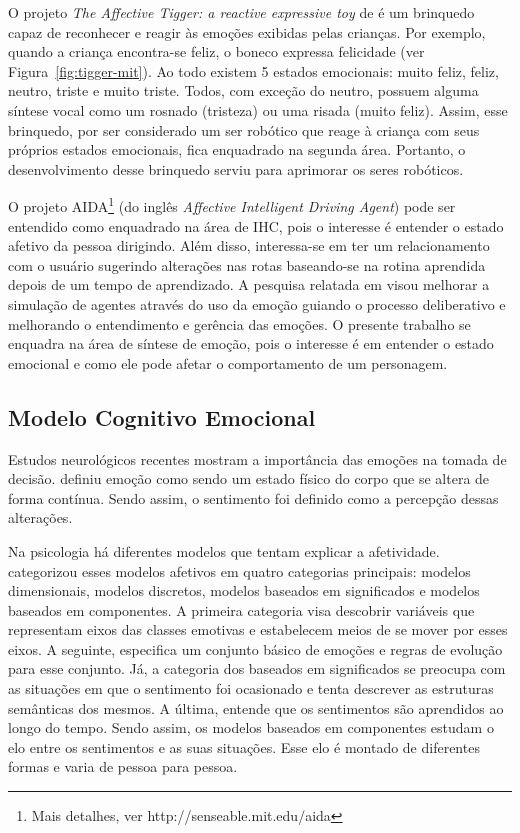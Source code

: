 O projeto \emph{The Affective Tigger: a reactive expressive toy} de
\citet{kirsch1999affective} é um brinquedo capaz de reconhecer e reagir às
emoções exibidas pelas crianças. Por exemplo, quando a criança encontra-se
feliz, o boneco expressa felicidade (ver Figura~\ref{fig:tigger-mit}). Ao todo
existem 5 estados emocionais: muito feliz, feliz, neutro, triste e muito
triste. Todos, com exceção do neutro, possuem alguma síntese vocal como um
rosnado (tristeza) ou uma risada (muito feliz). Assim, esse brinquedo, por ser
considerado um ser robótico que reage à criança com seus próprios estados
emocionais, fica enquadrado na segunda área.  Portanto, o desenvolvimento
desse brinquedo serviu para aprimorar os seres robóticos.

O projeto AIDA\footnote{Mais detalhes, ver http://senseable.mit.edu/aida} (do
inglês \emph{Affective Intelligent Driving Agent}) pode ser entendido como
enquadrado na área de IHC, pois o interesse é entender o estado afetivo da
pessoa dirigindo. Além disso, interessa-se em ter um relacionamento com o
usuário sugerindo alterações nas rotas baseando-se na rotina aprendida depois de
um tempo de aprendizado.  A pesquisa relatada em \citet{dias-agents} visou
melhorar a simulação de agentes através do uso da emoção guiando o processo
deliberativo e melhorando o entendimento e gerência das emoções.  O presente
trabalho se enquadra na área de síntese de emoção, pois o interesse é em
entender o estado emocional e como ele pode afetar o comportamento de um
personagem.

\subsection{Modelo Cognitivo Emocional} \label{ch-ca-mce}

Estudos neurológicos recentes \cite{ledoux1998emotional,damasio2004erro}
mostram a importância das emoções na tomada de decisão.
\citet{damasio2004erro} definiu emoção como sendo um estado físico do corpo
que se altera de forma contínua. Sendo assim, o sentimento foi definido como a
percepção dessas alterações.

Na psicologia há diferentes modelos que tentam explicar a afetividade.
\citet{scherer2000tnoe} categorizou esses modelos afetivos em quatro
categorias principais: modelos dimensionais, modelos discretos, modelos
baseados em significados e modelos baseados em componentes. A primeira
categoria visa descobrir variáveis que representam eixos das classes emotivas
e estabelecem meios de se mover por esses eixos. A seguinte, especifica um
conjunto básico de emoções e regras de evolução para esse conjunto.
Já, a categoria dos baseados em significados se preocupa com as situações
em que o sentimento foi ocasionado e tenta descrever as estruturas semânticas dos
mesmos. A última, entende que os sentimentos são aprendidos ao longo do tempo.
Sendo assim, os modelos baseados em componentes estudam o elo entre os
sentimentos e as suas situações. Esse elo é montado de diferentes formas e
varia de pessoa para pessoa.

